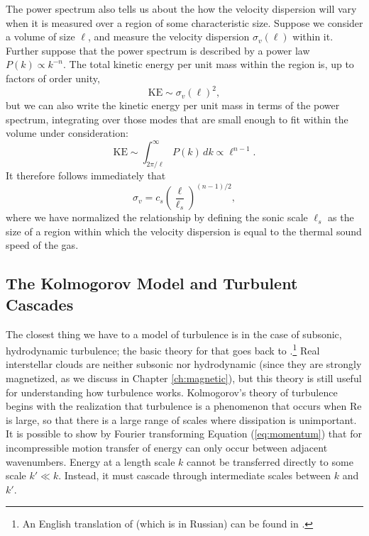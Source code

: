 The power spectrum also tells us about the how the velocity dispersion will vary when it is measured over a region of some characteristic size. Suppose we consider a volume of size $\ell$, and measure the velocity dispersion $\sigma_v(\ell)$ within it. Further suppose that the power spectrum is described by a power law $P(k)\propto k^{-n}$. The total kinetic energy per unit mass within the region is, up to factors of order unity,
\begin{equation}
\mathrm{KE} \sim \sigma_v(\ell)^2,
\end{equation}
but we can also write the kinetic energy per unit mass in terms of the power spectrum, integrating over those modes that are small enough to fit within the volume under consideration:
\begin{equation}
\mathrm{KE} \sim \int_{2\pi/\ell}^\infty P(k) \, dk \propto \ell^{n-1}.
\end{equation}
It therefore follows immediately that
\begin{equation}
\label{eq:vdisp}
\sigma_v = c_s \left(\frac{\ell}{\ell_s}\right)^{(n-1)/2},
\end{equation}
where we have normalized the relationship by defining the sonic scale $\ell_s$ as the size of a region within which the velocity dispersion is equal to the thermal sound speed of the gas.

\subsection{The Kolmogorov Model and Turbulent Cascades}

The closest thing we have to a model of turbulence is in the case of subsonic, hydrodynamic turbulence; the basic theory for that goes back to \citet{kolmogorov41a}.\footnote{An English translation of \citet{kolmogorov41a} (which is in Russian) can be found in \citet{kolmogorov91a}.} Real interstellar clouds are neither subsonic nor hydrodynamic (since they are strongly magnetized, as we discuss in Chapter \ref{ch:magnetic}), but this theory is still useful for understanding how turbulence works. Kolmogorov's theory of turbulence begins with the realization that turbulence is a phenomenon that occurs when Re is large, so that there is a large range of scales where dissipation is unimportant. It is possible to show by Fourier transforming Equation (\ref{eq:momentum}) that for incompressible motion transfer of energy can only occur between adjacent wavenumbers. Energy at a length scale $k$ cannot be transferred directly to some scale $k' \ll k$. Instead, it must cascade through intermediate scales between $k$ and $k'$.


